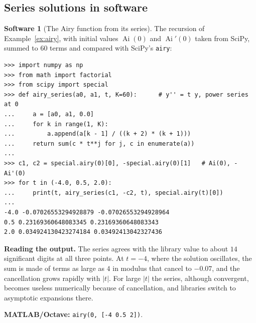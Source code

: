 \documentclass[11pt,a4paper]{article}
\numberwithin{equation}{section}
\theoremstyle{definition}
\newtheorem{software}[thm]{Software}
\begin{document}
\subsection{Series solutions in software}
\label{ssec:software8}

\begin{software}[The Airy function from its series]
\label{sw:airy}
The recursion of Example~\ref{ex:airy}, with initial values $\operatorname{Ai}(0)$ and $\operatorname{Ai}'(0)$ taken from SciPy, summed to $60$ terms and compared with SciPy's \texttt{airy}:
{\small\begin{verbatim}
>>> import numpy as np
>>> from math import factorial
>>> from scipy import special
>>> def airy_series(a0, a1, t, K=60):      # y'' = t y, power series at 0
...     a = [a0, a1, 0.0]
...     for k in range(1, K):
...         a.append(a[k - 1] / ((k + 2) * (k + 1)))
...     return sum(c * t**j for j, c in enumerate(a))
...
>>> c1, c2 = special.airy(0)[0], -special.airy(0)[1]   # Ai(0), -Ai'(0)
>>> for t in (-4.0, 0.5, 2.0):
...     print(t, airy_series(c1, -c2, t), special.airy(t)[0])
...
-4.0 -0.07026553294928879 -0.07026553294928964
0.5 0.23169360648083345 0.23169360648083343
2.0 0.034924130423274184 0.03492413042327436
\end{verbatim}}
\textbf{Reading the output.} The series agrees with the library value to about $14$ significant digits at all three points. At $t = -4$, where the solution oscillates, the sum is
made of terms as large as $4$ in modulus that cancel to $-0.07$, and the cancellation grows rapidly with $|t|$. For large $|t|$ the series, although convergent, becomes useless numerically because of cancellation, and libraries switch to asymptotic expansions there.

\textbf{MATLAB/Octave:} \texttt{airy(0, [-4 0.5 2])}.
\end{software}
\end{document}
